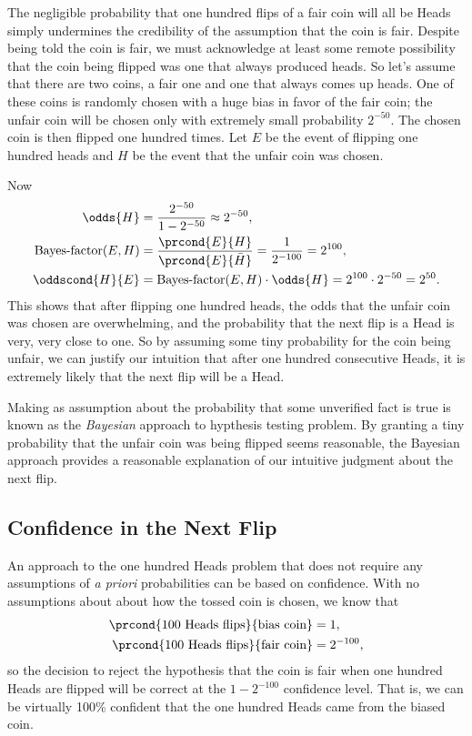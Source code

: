 The negligible probability that one hundred flips of a fair coin will
all be Heads simply undermines the credibility of the assumption that
the coin is fair.  Despite being told the coin is fair, we must
acknowledge at least some remote possibility that the coin being
flipped was one that always produced heads.  So let's assume that
there are two coins, a fair one and one that always comes up heads.
One of these coins is randomly chosen with a huge bias in favor of the
fair coin; the unfair coin will be chosen only with extremely small
probability $2^{-50}$.  The chosen coin is then flipped one hundred
times.  Let $E$ be the event of flipping one hundred heads and $H$ be
the event that the unfair coin was chosen.

Now
\begin{align*}
\odds{H} & = \frac{2^{-50}}{1-2^{-50}} \approx 2^{-50},\\
\BF{E}{H} & = \frac{\prcond{E}{H}}{\prcond{E}{\bar{H}}} = \frac{1}{2^{-100}} = 2^{100},\\
\oddscond{H}{E} & = \BF{E}{H} \cdot \odds{H} = 2^{100} \cdot 2^{-50} = 2^{50}.
\end{align*}
This shows that after flipping one hundred heads, the odds that the
unfair coin was chosen are overwhelming, and the probability that the
next flip is a Head is very, very close to one.  So by assuming some
tiny probability for the coin being unfair, we can justify our
intuition that after one hundred consecutive Heads, it is extremely
likely that the next flip will be a Head.

Making as assumption about the probability that some unverified fact
is true is known as the \emph{Bayesian} approach to hypthesis testing
problem.  By granting a tiny probability that the unfair coin was
being flipped seems reasonable, the Bayesian approach provides a
reasonable explanation of our intuitive judgment about the next flip.

\subsection{Confidence in the Next Flip}

An approach to the one hundred Heads problem that does not require any
assumptions of \emph{a priori} probabilities can be based on
confidence.  With no assumptions about about how the tossed coin is
chosen, we know that
\begin{align*}
\prcond{\text{100 Heads flips}}{\text{bias coin}} & = 1,\\
\prcond{\text{100 Heads flips}}{\text{fair coin}} & = 2^{-100},
\end{align*}
so the decision to reject the hypothesis that the coin is fair when
one hundred Heads are flipped will be correct at the $1-2^{-100}$ confidence
level.  That is, we can be virtually 100\% confident that the one hundred
Heads came from the biased coin.

